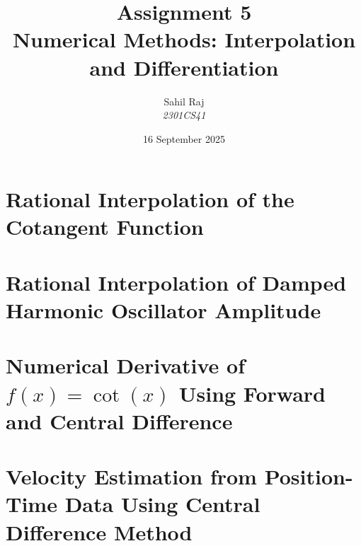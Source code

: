 \documentclass[12pt,a4paper]{report}
\title{\textbf{Assignment 5}\\Numerical Methods: Interpolation and Differentiation}
\author{Sahil Raj\\\textit{2301CS41}}
\date{16 September 2025}
\begin{document}
\maketitle
\tableofcontents
\clearpage

\chapter{Rational Interpolation of the Cotangent Function}

\chapter{Rational Interpolation of Damped Harmonic Oscillator Amplitude}

\chapter{Numerical Derivative of $f(x) = \cot(x)$ Using Forward and Central Difference}

\chapter{Velocity Estimation from Position-Time Data Using Central Difference Method}
\end{document}

